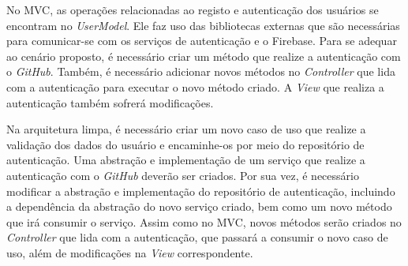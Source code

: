 No MVC, as operações relacionadas ao registo e autenticação dos usuários se encontram no \emph{UserModel}.
Ele faz uso das bibliotecas externas que são necessárias para comunicar-se com os serviços de autenticação e o Firebase.
Para se adequar ao cenário proposto, é necessário criar um método que realize a autenticação com o \emph{GitHub}.
Também, é necessário adicionar novos métodos no \emph{Controller} que lida com a autenticação para executar o novo método criado.
A \emph{View} que realiza a autenticação também sofrerá modificações.

Na arquitetura limpa, é necessário criar um novo caso de uso que realize a validação dos dados do usuário e encaminhe-os por meio do repositório de autenticação.
Uma abstração e implementação de um serviço que realize a autenticação com o \emph{GitHub} deverão ser criados.
Por sua vez, é necessário modificar a abstração e implementação do repositório de autenticação, incluindo a dependência da abstração do novo serviço criado, bem como um novo método que irá consumir o serviço.
Assim como no MVC, novos métodos serão criados no \emph{Controller} que lida com a autenticação, que passará a consumir o novo caso de uso, além de modificações na \emph{View} correspondente.